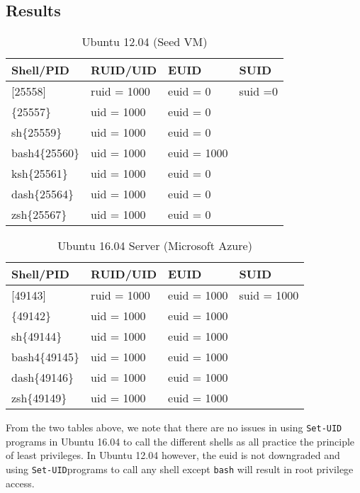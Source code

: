 \documentclass[a4paper,12pt]{article}
\newcommand{\setuid}{\texttt{Set-UID}}
\begin{document}
\subsection{Results}
\begin{table}[h]
	\centering
	\label{sh4.2tab}
	\bgroup
	\def\arraystretch{1.3}
	\begin{tabular}{l|l|l|l}
		Shell/PID      & RUID/UID    & EUID        & SUID    \\ \hline
		{[}25558{]}    & ruid = 1000 & euid = 0    & suid =0 \\ \hline
		\{25557\}      & uid = 1000  & euid = 0    &         \\ \cline{1-3}
		sh\{25559\}    & uid = 1000  & euid = 0    &         \\ \cline{1-3}
		bash4\{25560\} & uid = 1000  & euid = 1000 &         \\ \cline{1-3}
		ksh\{25561\}   & uid = 1000  & euid = 0    &         \\ \cline{1-3}
		dash\{25564\}  & uid = 1000  & euid = 0    &         \\ \cline{1-3}
		zsh\{25567\}   & uid = 1000  & euid = 0    &        
	\end{tabular}
	\egroup
	\caption{Ubuntu 12.04 (Seed VM)}
\end{table}
\begin{table}[h]
	\centering
	\label{sh4.3tab}
	\bgroup
	\def\arraystretch{1.3}
	\begin{tabular}{l|l|l|l}
		Shell/PID      & RUID/UID    & EUID        & SUID    \\ \hline
		{[}49143{]}    & ruid = 1000 & euid = 1000 & suid = 1000 \\ \hline
		\{49142\}      & uid = 1000  & euid = 1000 &         \\ \cline{1-3}
		sh\{49144\}    & uid = 1000  & euid = 1000 &         \\ \cline{1-3}
		bash4\{49145\} & uid = 1000  & euid = 1000 &         \\ \cline{1-3}
		dash\{49146\}  & uid = 1000  & euid = 1000 &         \\ \cline{1-3}
		zsh\{49149\}   & uid = 1000  & euid = 1000 &         
	\end{tabular}
	\egroup
	\caption{Ubuntu 16.04 Server (Microsoft Azure)}
\end{table}
\noindent From the two tables above, we note that there are no issues in using \texttt{Set-UID} programs in Ubuntu 16.04 to call the different shells as all practice the principle of least privileges. In Ubuntu 12.04 however, the euid is not downgraded and using \setuid programs to call any shell except \texttt{bash} will result in root privilege access. 
\end{document}
